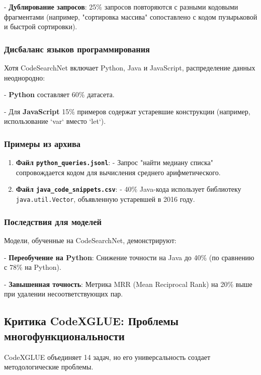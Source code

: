\documentclass[14pt]{article}
\theoremstyle{definition}
\begin{document}
- \textbf{Дублирование запросов}: 25\% запросов повторяются с разными кодовыми фрагментами (например, "сортировка массива" сопоставлено с кодом пузырьковой и быстрой сортировки).


\subsubsection{Дисбаланс языков программирования}

Хотя CodeSearchNet включает Python, Java и JavaScript, распределение данных неоднородно:

    
- \textbf{Python} составляет 60\% датасета.
    
- Для \textbf{JavaScript} 15\% примеров содержат устаревшие конструкции (например, использование `var` вместо `let`).


\subsubsection{Примеры из архива}

\begin{enumerate}
    \item \textbf{Файл \texttt{python\_queries.jsonl}}:  
      - Запрос "найти медиану списка" сопровождается кодом для вычисления среднего арифметического.
    \item \textbf{Файл \texttt{java\_code\_snippets.csv}}:  
      - 40\% Java-кода использует библиотеку \texttt{java.util.Vector}, объявленную устаревшей в 2016 году.
\end{enumerate}

\subsubsection{Последствия для моделей}

Модели, обученные на CodeSearchNet, демонстрируют:

    
- \textbf{Переобучение на Python}: Снижение точности на Java до 40\% (по сравнению с 78\% на Python).
    
- \textbf{Завышенная точность}: Метрика MRR (Mean Reciprocal Rank) на 20\% выше при удалении несоответствующих пар.


\subsection{Критика CodeXGLUE: Проблемы многофункциональности}

CodeXGLUE \cite{codexglue} объединяет 14 задач, но его универсальность создает методологические проблемы.
\end{document}
